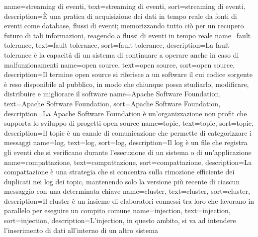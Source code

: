 {
    name={streaming di eventi},
    text=streaming di eventi,
    sort=streaming di eventi,
    description={È una pratica di acquisizione dei dati in tempo reale da fonti di eventi come database, flussi
    di eventi; memorizzando tutto ciò per un recupero futuro di tali informazioni, reagendo a
    flussi di eventi in tempo reale}
}
{
    name={fault tolerance},
    text=fault tolerance,
    sort=fault tolerance,
    description={La fault tolerance è la capacità di un sistema di continuare a operare anche in caso di malfunzionamenti}
}
{
    name={open source},
    text=open source,
    sort=open source,
    description={Il termine open source si riferisce a un software il cui codice sorgente è reso disponibile al pubblico, in modo che chiunque possa studiarlo, modificare, distribuire e migliorare il software}
}
{
    name={Apache Software Foundation},
    text=Apache Software Foundation,
    sort=Apache Software Foundation,
    description={La Apache Software Foundation è un'organizzazione non profit che supporta lo sviluppo di progetti open source}
}
{
    name={topic},
    text=topic,
    sort=topic,
    description={Il topic è un canale di comunicazione che permette di categorizzare i messaggi}
}
{
    name={log},
    text=log,
    sort=log,
    description={Il log è un file che registra gli eventi che si verificano durante l'esecuzione di un sistema o di un'applicazione}
}
{
    name={compattazione},
    text=compattazione,
    sort=compattazione,
    description={La compattazione è una strategia che si concentra sulla rimozione efficiente dei duplicati nei log dei topic, mantenendo solo la versione più recente di ciascun messaggio con una determinata chiave}
}
{
    name={cluster},
    text=cluster,
    sort=cluster,
    description={Il cluster è un insieme di elaboratori connessi tra loro che lavorano in parallelo per eseguire un compito comune}
}
{
    name={injection},
    text=injection,
    sort=injection,
    description={L'injection, in questo ambito, si va ad intendere l'inserimento di dati all'interno di un altro sistema}
}